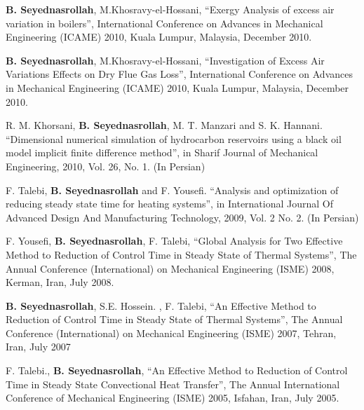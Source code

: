\documentclass[10pt]{article}
\newenvironment{changemargin}[2]{%
  \begin{list}{}{%
 \setlength{\topsep}{0pt}%
 \setlength{\leftmargin}{#1}%
 \setlength{\rightmargin}{#2}%
 \setlength{\listparindent}{\parindent}%
 \setlength{\itemindent}{\parindent}%
 \setlength{\parsep}{\parskip}%
  }%
  \item[]}{\end{list}
}
\newenvironment{body} {
  \vspace*{-2pt}
  \begin{changemargin}{-0.5in}{-0.5in}
}
{\end{changemargin}
}
\begin{document}
\begin{body}
\begin{etaremune}
    \item \textbf{B. Seyednasrollah}, M.Khosravy-el-Hossani, ``Exergy Analysis of excess air variation in boilers'', International Conference on Advances in Mechanical Engineering (ICAME) 2010, Kuala Lumpur, Malaysia, December 2010.\\
    \medskip

    \item \textbf{B. Seyednasrollah}, M.Khosravy-el-Hossani, ``Investigation of Excess Air Variations Effects on Dry Flue Gas Loss'', International Conference on Advances in Mechanical Engineering (ICAME) 2010, Kuala Lumpur, Malaysia, December 2010.\\
    \medskip

    \item  R. M. Khorsani, \textbf{B. Seyednasrollah}, M. T. Manzari and S. K. Hannani. ``Dimensional numerical simulation of hydrocarbon reservoirs using a black oil model implicit finite difference method'', in Sharif Journal of Mechanical Engineering, 2010, Vol. 26, No. 1. (In Persian)\\
    \medskip

    \item F. Talebi, \textbf{B. Seyednasrollah} and F. Yousefi. ``Analysis and optimization of reducing steady state time for heating systems'', in International Journal Of Advanced Design And Manufacturing Technology, 2009, Vol. 2 No. 2.  (In Persian)\\
    \medskip

    \item F. Yousefi, \textbf{B. Seyednasrollah}, F. Talebi, ``Global Analysis for Two Effective Method to Reduction of Control Time in Steady State of Thermal Systems'', The Annual Conference (International) on Mechanical Engineering (ISME) 2008, Kerman, Iran, July 2008. \\
    \medskip

    \item \textbf{B. Seyednasrollah}, S.E. Hossein. , F. Talebi, ``An Effective Method to Reduction of Control Time in Steady State of Thermal Systems'', The Annual Conference (International) on Mechanical Engineering (ISME) 2007, Tehran, Iran, July 2007\\
    \medskip

    \item F. Talebi., \textbf{B. Seyednasrollah}, ``An Effective Method to Reduction of Control Time in Steady State Convectional Heat Transfer'', The Annual International Conference of Mechanical Engineering (ISME) 2005, Isfahan, Iran, July 2005.\\
    \medskip

  \end{etaremune}

\end{body}
\end{document}
